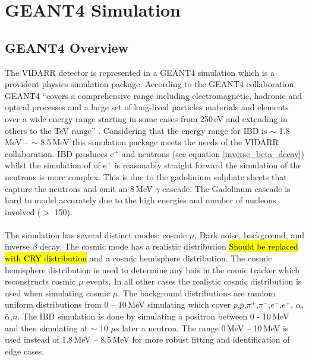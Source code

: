 

\chapter{GEANT4 Simulation}\label{chp:geant4Simulation}
\ifpdf
    \graphicspath{{Chapter4/Figs/Raster/}{Chapter4/Figs/PDF/}{Chapter4/Figs/}}
\else
    \graphicspath{{Chapter4/Figs/Vector/}{Chapter4/Figs/}}
\fi

\section{GEANT4 Overview}\label{sec:geant4Simulation_g4Overview}
The VIDARR detector is represented in a GEANT4 simulation which is a provident physics simulation package. According to the GEANT4 collaboration GEANT4 ``covers a comprehensive range including electromagnetic, hadronic and optical processes and a large set of long-lived particles materials and elements over a wide energy range starting in some cases from 250\,eV and extending in others to the TeV range'' \cite{Agostinelli:2002hh}. Considering that the energy range for IBD is $\sim$ 1.8\,MeV -- $\sim$ 8.5\,MeV \cite{Mueller_2011} this simulation package meets the needs of the VIDARR collaboration. IBD produces e$^+$ and neutrons (see equation \ref{inverse_beta_decay}) whilst the simulation of of e$^+$ is reasonably straight forward the simulation of the neutrons is more complex. This is due to the gadolinium sulphate sheets that capture the neutrons and emit an 8\,MeV $\gamma$ cascade. The Gadolinum cascade is hard to model accurately due to the high energies and number of nucleons involved ($>$ 150).
\\\\The simulation has several distinct modes: cosmic $\mu$, Dark noise, background, and inverse $\beta$ decay. The cosmic mode has a realistic distribution \hl{Should be replaced with CRY distribution} and a cosmic hemisphere distribution. The cosmic hemisphere distribution is used to determine any bais in the comic tracker which reconstructs cosmic $\mu$ events. In all other cases the realistic cosmic distribution is used when simulating cosmic $\mu$. The background distributions are random uniform distributions from 0 -- 10\,MeV simulating which cover $p$,$\bar{p}$,$\pi^+$,$\pi^-$,$e^-$,$e^+$, $\alpha$,$\bar{\alpha}$,$n$. The IBD simulation is done by simulating a positron between 0 - 10\,MeV and then simulating at $\sim$ 10 $\mu$s later a neutron. The range 0\,MeV -- 10\,MeV is used instead of 1.8\,MeV -- 8.5\,MeV for more robust fitting and identification of edge cases.
